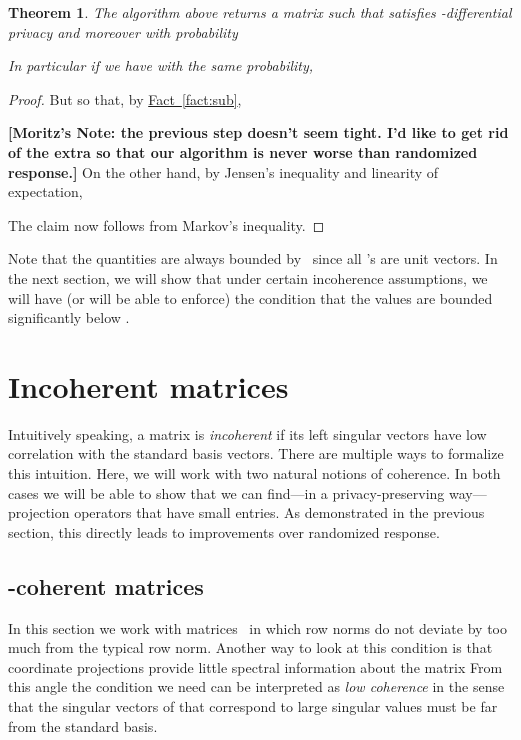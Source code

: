 \documentclass[letterpaper,11pt]{article}
\newcommand{\authnote}[2]{{ \footnotesize \bf{\color{DarkRed}[#1's Note:
{\color{DarkBlue}#2}]}}}
\newcommand{\authnote}[2]{}
\newcommand{\Mnote}[1]{{\authnote{Moritz} {#1}}}
\newtheorem{theorem}{Theorem}[section]
\theoremstyle{definition}
\newcommand{\factref}[1]{\hyperref[fact:#1]{Fact~\ref{fact:#1}}}
\newcommand{\sectionlabel}[1]{\label{sec:#1}}
\newcommand{\theoremlabel}[1]{\label{thm:#1}}
\begin{document}
\begin{theorem}\theoremlabel{projection}
The algorithm above returns a matrix  such that  satisfies
-differential privacy and moreover with probability


In particular if  we have with the same probability,

\end{theorem}

\begin{proof}

But  so that, by \factref{sub},

\Mnote{the previous step doesn't seem tight. I'd like to get rid of the extra
 so that our algorithm is never worse than randomized response.}
On the other hand, by Jensen's inequality and linearity of expectation,

The claim now follows from Markov's inequality.
\end{proof}

Note that the quantities  are always bounded by~ since all 's are unit
vectors. In the next section, we will show that under certain incoherence assumptions, we will have (or will be able to enforce) the condition that the  values are bounded significantly below .



\section{Incoherent matrices}
\sectionlabel{incoherent}

Intuitively speaking, a matrix is \emph{incoherent} if its left singular vectors
have low correlation with the standard basis vectors. There are multiple ways to
formalize this intuition. Here, we will work with two natural notions of
coherence. In both cases we will be able to show that we can find---in a
privacy-preserving way---projection operators that have small entries. As
demonstrated in the previous section, this directly leads to improvements over
randomized response.

\subsection{-coherent matrices}

In this section we work with matrices~ in which row norms do not deviate by
too much from the typical row norm.
Another way to look at this condition is that coordinate projections
provide little spectral information about the matrix  From this angle the
condition we need can be interpreted as \emph{low coherence} in the sense that
the singular vectors of  that correspond to large singular values
must be far from the standard basis.
\end{document}
